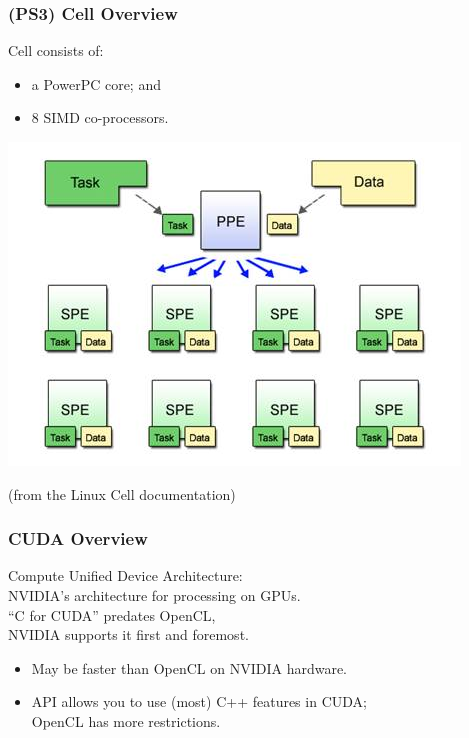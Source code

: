\begin{frame}
  \frametitle{(PS3) Cell Overview}


  Cell consists of:
  \begin{itemize}
    \item a PowerPC core; and
    \item 8 SIMD co-processors.
  \end{itemize}


  \begin{center}
    \includegraphics[scale=0.5]{images/cell}
  \end{center}
  \hfill (from the Linux Cell documentation)

\end{frame}

\begin{frame}
  \frametitle{CUDA Overview}
  

     Compute Unified Device Architecture:\\
     NVIDIA's architecture for processing on GPUs.\\[1em]

     ``C for CUDA'' predates OpenCL,\\
     NVIDIA supports it first and foremost.
      \begin{itemize}
        \item May be faster than OpenCL on NVIDIA hardware.
        \item API allows you to use (most) C++ features in CUDA; \\
          OpenCL has more restrictions.
      \end{itemize}

\end{frame}

